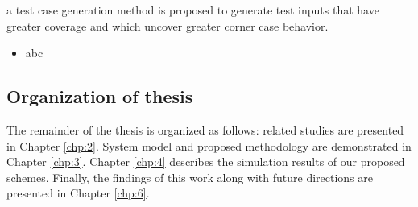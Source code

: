 a test case generation method is proposed to generate test inputs that have greater coverage and which uncover greater corner case behavior.
\begin{itemize}	
	\item abc
\end{itemize}


\subsection{Organization of thesis}\hypertarget{organization of thesis}{}
The remainder of the thesis is organized as follows: related studies are presented in Chapter \ref{chp:2}. System model and proposed methodology are demonstrated in Chapter \ref{chp:3}. Chapter \ref{chp:4} describes the simulation results of our proposed schemes. Finally, the findings of this work along with future directions are presented in Chapter \ref{chp:6}.


\clearpage
